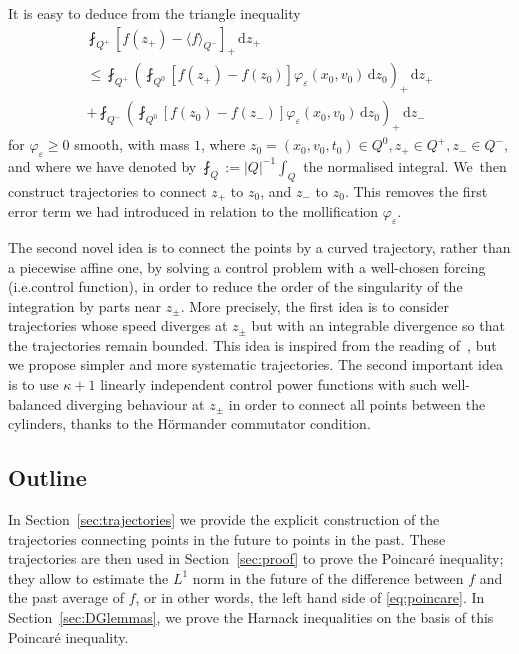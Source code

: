 \documentclass[10pt]{amsart}
\providecommand{\ie}{i.e.}
\theoremstyle{definition}
\newcommand{\dd}{{\, \mathrm d}}
\let\var\varepsilon
\begin{document}
It is easy to deduce from the triangle inequality\vspace*{-5pt}
\begin{multline}\label{eq:split-Q0}
\fint_{Q^+} \left[ f(z_+) - \langle f \rangle_{Q^-} \right]_+ \dd z_+\\[-5pt]
\le
\fint_{Q^+} \left(\fint_{Q^0} \left[ f(z_+) -
f(z_0) \right] \varphi_\var(x_0, v_0)\dd z_0 \right)_+ \dd z_+ \\[-5pt]
+ \fint_{Q^-} \left(\fint_{Q^0} \left[ f(z_0) -
f(z_-) \right]\varphi_\var(x_0, v_0) \dd z_0 \right)_+ \dd z_-
\end{multline}
for $\varphi_\var \ge 0$ smooth, with mass $1$, where
$z_0=(x_0,v_0,t_0) \in Q^0, z_+ \in Q^+, z_- \in Q^-$, and where
we have denoted by $\fint_{Q} := |Q|^{-1} \int_Q$ the normalised
integral. We~then construct trajectories to connect $z_+$ to
$z_0$, and $z_-$ to $z_0$. This removes the first error term we
had introduced in relation to the mollification $\varphi_\var$.

The second novel idea is to connect the points by a curved
trajectory, rather than a piecewise affine one, by solving a
control problem with a well-chosen forcing (\ie control
function), in order to reduce the order of the singularity of the
integration by parts near $z_{\pm}$. More precisely, the first
idea is to consider trajectories whose speed diverges at
$z_{\pm}$ but with an integrable divergence so that the
trajectories remain bounded. This idea is inspired from the
reading of~\cite{niebel2022kinetic}, but we propose simpler and
more systematic trajectories. The second important idea is to use
$\kappa+1$ linearly independent control power functions with such
well-balanced diverging behaviour at $z_{\pm}$ in order to
connect all points between the cylinders, thanks to the Hörmander
commutator condition.

\subsection{Outline}

In Section~\ref{sec:trajectories} we provide the explicit construction
of the trajectories connecting points in the future to points in
the past. These trajectories are then used in
Section~\ref{sec:proof} to prove the Poincaré inequality; they
allow to estimate the $L^1$ norm in the future of the difference
between $f$ and the past average of $f$, or in other words, the
left hand side of \eqref{eq:poincare}. In Section~\ref{sec:DGlemmas}, we
prove the Harnack inequalities on the basis of this Poincaré
inequality.
\end{document}
